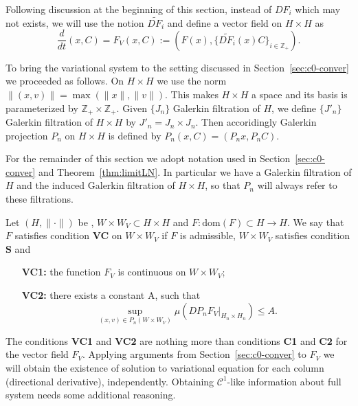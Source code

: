 Following discussion at the beginning of this section, instead of $DF_i$ which may not exists, we will use the notion $\widetilde{DF_i}$ and define a vector field on $H \times H$ as
\begin{equation}
  \frac{d}{dt} (x,C)=F_V(x,C):=(F(x),\{\widetilde{DF_i}(x)C\}_{i\in\mathbb Z_+}).  \label{eq:sysVarH}
\end{equation}



To bring the variational system to the setting discussed in Section~\ref{sec:c0-conver} we proceeded as follows. On $H \times H$ we use the norm $\|(x,v)\|=\max(\|x\|,\|v\|)$. This makes $H\times H$ a \gss space and its basis is parameterized by $\mathbb{Z}_+ \times \mathbb{Z}_+$. Given $\{J_n\}$ Galerkin filtration of $H$, we define $\{J'_n\}$ Galerkin filtration of $H \times H$ by $J'_n=J_n \times J_n$.  Then accoridingly  Galerkin projection $P_n$ on $H\times H$ is defined by  $P_n(x,C)=(P_nx,P_nC)$.


For the remainder of this section we adopt notation used in Section~\ref{sec:c0-conver} and Theorem~\ref{thm:limitLN}. In particular we have a Galerkin filtration of $H$ and
the induced Galerkin filtration of $H \times H$, so that $P_n$ will always refer to these filtrations.

\begin{definition}
\label{def:condV}
Let $(H,\|\cdot\|)$ be \gss,  $W\times W_V\subset H\times H$ and $F:\mathrm{dom}(F)\subset H \to H$. We say that $F$ satisfies condition \textbf{VC} on $W\times W_V$ if $F$ is admissible, $W\times W_V$ satisfies condition \textbf{S} and
\begin{itemize}
	\item[\bf{VC1:}] the function $F_V$ is continuous on $W\times W_V$;
	\item[\bf{VC2:}] there exists a constant A, such that
	$$
		\sup_{(x,v)\in P_n(W\times W_V)}\mu(DP_nF_V|_{H_n\times H_n})\leq A.
	$$
\end{itemize}
\end{definition}

The conditions \textbf{VC1} and \textbf{VC2} are nothing more than conditions \textbf{C1} and \textbf{C2}  for the vector field $F_V$. Applying arguments from Section~\ref{sec:c0-conver} to $F_V$ we will obtain the existence of solution to variational equation for each column (directional derivative), independently. Obtaining $\mathcal C^1$-like information about full system needs some additional reasoning.

